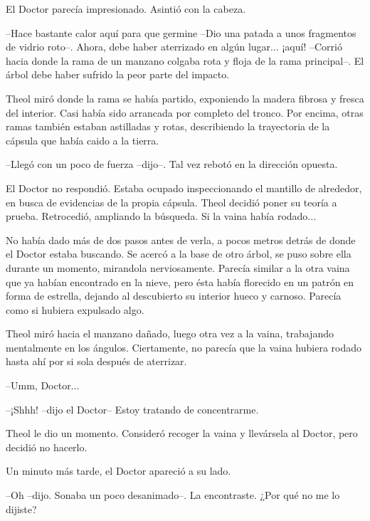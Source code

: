 El Doctor parecía impresionado. Asintió con la cabeza.

--Hace bastante calor aquí para que germine --Dio una patada a unos fragmentos de vidrio roto--. Ahora, debe haber aterrizado en algún lugar... ¡aquí! --Corrió hacia donde la rama de un manzano colgaba rota y floja de la rama principal--. El árbol debe haber sufrido la peor parte del impacto.



Theol miró donde la rama se había partido, exponiendo la madera fibrosa y fresca del interior. Casi había sido arrancada por completo del tronco. Por encima, otras ramas también estaban astilladas y rotas, describiendo la trayectoria de la cápsula que había caido a la tierra.

--Llegó con un poco de fuerza --dijo--. Tal vez rebotó en la dirección opuesta.



El Doctor no respondió. Estaba ocupado inspeccionando el mantillo de alrededor, en busca de evidencias de la propia cápsula. Theol decidió poner su teoría a prueba. Retrocedió, ampliando la búsqueda. Si la vaina había rodado...



No había dado más de dos pasos antes de verla, a pocos metros detrás de donde el Doctor estaba buscando. Se acercó a la base de otro árbol, se puso sobre ella durante un momento, mirandola nerviosamente. Parecía similar a la otra vaina que ya habían encontrado en la nieve, pero ésta había florecido en un patrón en forma de estrella, dejando al descubierto su interior hueco y carnoso. Parecía como si hubiera expulsado algo.



Theol miró hacia el manzano dañado, luego otra vez a la vaina, trabajando mentalmente en los ángulos. Ciertamente, no parecía que la vaina hubiera rodado hasta ahí por si sola después de aterrizar.

--Umm, Doctor...



--¡Shhh! --dijo el Doctor-- Estoy tratando de concentrarme.



Theol le dio un momento. Consideró recoger la vaina y llevársela al Doctor, pero decidió no hacerlo.



Un minuto más tarde, el Doctor apareció a su lado.

--Oh --dijo. Sonaba un poco desanimado--. La encontraste. ¿Por qué no me lo dijiste?



